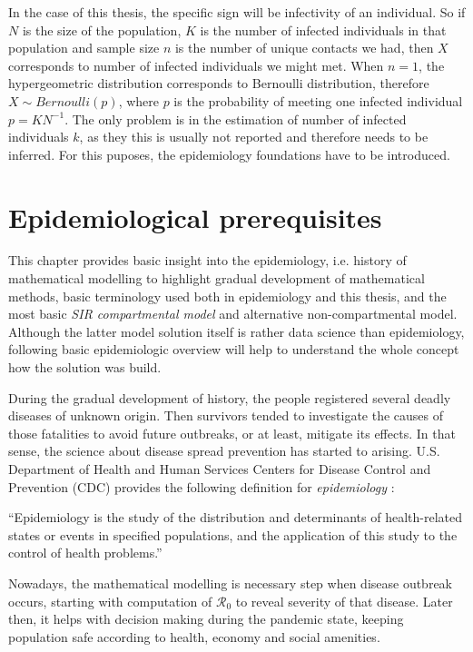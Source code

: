 \documentclass[
  digital, %
  table,   %
  twoside, %
  12pt,
  lof,     %
  lot,     %
]{fithesis3}
\begin{document}
In the case of this thesis, the specific sign will be 
infectivity of an individual.
So if $N$ is the size of the population, $K$ is the 
number of infected individuals in that population and 
sample size $n$ is the number of unique contacts we 
had, then $X$ corresponds to number of infected 
individuals we might met. When $n = 1$, the 
hypergeometric distribution corresponds to Bernoulli 
distribution, therefore 
$X \sim Bernoulli \left( p \right)$, where $p$ is the 
probability of meeting one infected individual 
$p = K N^{-1}$. 
The only problem is in the estimation of number of 
infected individuals $k$, as they this is usually not 
reported and therefore needs to be inferred. 
For this puposes, the epidemiology foundations have 
to be introduced.


\chapter{Epidemiological prerequisites}

This chapter provides basic insight into the epidemiology, 
i.e. history of mathematical modelling to highlight gradual 
development of mathematical methods, basic terminology 
used both in epidemiology and this thesis, and the most 
basic \textit{SIR compartmental model} and alternative
non-compartmental model.
Although the latter model solution itself is rather data 
science than epidemiology, following basic epidemiologic 
overview will help to understand the whole concept how 
the solution was build.

During the gradual development of history,
the people registered several deadly diseases of unknown origin.
Then survivors tended to investigate the causes of those 
fatalities to avoid future outbreaks, or at least, mitigate its effects.
In that sense, the science about disease spread 
prevention has started to arising.
U.S. Department of Health and Human Services Centers 
for Disease Control and Prevention (CDC) provides the 
following definition for \textit{epidemiology} \cite{cdc2006}:

\begin{displayquote}
``Epidemiology is the study of the distribution and
determinants of health-related states or events in specified
populations, and the application of this study to the control
of health problems.''
\end{displayquote}

Nowadays, the mathematical modelling is necessary 
step when disease outbreak occurs, starting with computation 
of $\mathcal{R}_0$ to reveal severity of that disease.
Later then, it helps with decision 
making during the pandemic state, keeping population safe 
according to health, economy and social amenities.
\end{document}
